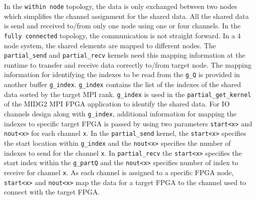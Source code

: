 In the \texttt{within node} topology, the data is only exchanged between two nodes
which simplifies the channel assignment for the shared data. All the shared data is send and received
to/from only one node using one or four channels. In the \texttt{fully connected} topology,
the communication is not straight forward. In a 4 node system, the shared elements are mapped
to different nodes. The \texttt{partial\_send} and \texttt{partial\_recv} kernels need this mapping
information at the runtime to transfer and receive data correctly to/from target node. The mapping information
for identifying the indexes to be read from the \texttt{g\_Q} is provided in another buffer
\texttt{g\_index}. \texttt{g\_index} contains the list of the indexes of the shared data
sorted by the target MPI rank. \texttt{g\_index} is used in the \texttt{partial\_get\_kernel}
of the MIDG2 MPI FPGA application to identify the shared data. For IO channels design along with
\texttt{g\_index}, additional information for mapping the indexes to specific target FPGA is
passed by using two parameters \texttt{start<x>} and \texttt{nout<x>} for each channel \texttt{x}.
In the \texttt{partial\_send} kernel, the \texttt{start<x>} specifies the start location within \texttt{g\_index}
and the \texttt{nout<x>} specifies the number of indexes to send for the channel \texttt{x}. In
\texttt{partial\_recv} the \texttt{start<x>} specifies the start index within the \texttt{g_partQ}
and the \texttt{nout<x>} specifies number of index to receive for channel \texttt{x}. As each
channel is assigned to a specific FPGA node, \texttt{start<x>} and \texttt{nout<x>} map
the data for a target FPGA to the channel used to connect with the target FPGA.

